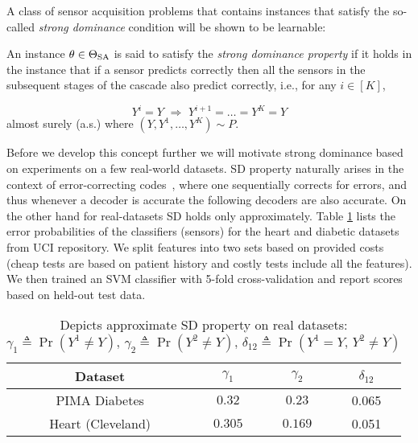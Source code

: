 A class of sensor acquisition problems that contains instances that satisfy the so-called \emph{strong dominance} condition 
will be shown to be learnable:
\begin{defi}
An instance $\theta \in \Theta_{\mathrm{SA}}$  is said to satisfy the \emph{strong dominance property} if 
it holds in the instance that if a sensor predicts correctly
then all the sensors in the subsequent stages of the cascade also predict correctly, i.e., 
for any $i\in [K]$,
	
    \begin{equation}
	\label{eqn:DominanceCondition}
	Y^i=Y \,\, \Rightarrow\,\, Y^{i+1}= \dots =  Y^K = Y
	\end{equation}
	almost surely (a.s.)
	where $(Y,Y^1,\dots,Y^K)\sim P$.
\end{defi}
Before we develop this concept further we will motivate strong dominance based on experiments on a few real-world datasets. SD property naturally arises in the context of error-correcting codes~\cite{list-decoding}, where one sequentially corrects for errors, and thus whenever a decoder is accurate the following decoders are also accurate. On the other hand for real-datasets SD holds only approximately. Table \ref{tab:ErrorTable1} lists the error probabilities of the classifiers (sensors) for the heart and diabetic datasets from UCI repository. We split features into two sets based on provided costs (cheap tests are based on patient history and costly tests include all the features). We then trained an SVM classifier with 5-fold cross-validation and report scores based on held-out test data. 
\begin{table}[h]
\vspace{-6pt}
\begin{center}
\begin{tabular}[c]{c|c|c|c } 
Dataset & $\gamma_1$ & $\gamma_2$ & $\delta_{12}$\\ \hline \hline
PIMA Diabetes & $0.32 $ & $ 0.23$  & 0.065\\  \hline
Heart (Cleveland) & $0.305$ & $0.169$ &  0.051\\  \hline
\end{tabular}
\label{tab:ErrorTable1}
\caption{\footnotesize Depicts approximate SD property on real datasets: $\gamma_1 \triangleq \Pr(Y^1 \neq Y),\,\gamma_2\triangleq \Pr(Y^2 \neq Y),\, \delta_{12} \triangleq \Pr(Y^1=Y,\, Y^2\neq Y)$ }
\end{center}
\vspace{-13pt}
\end{table}
